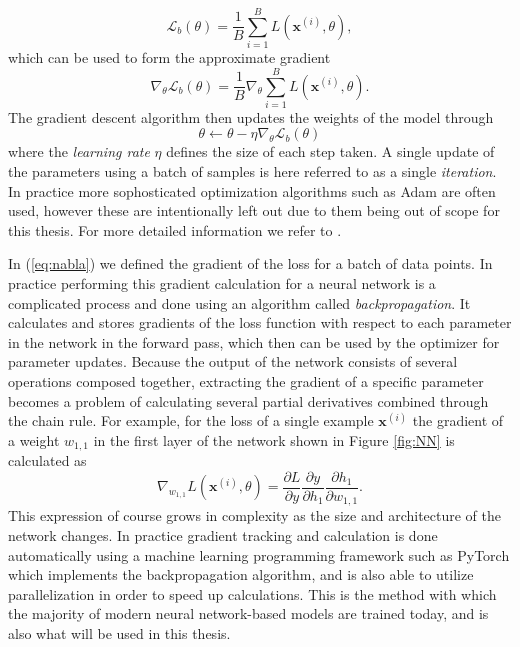 \documentclass{report}
\begin{document}
\begin{equation}
    \mathcal{L}_{b}(\theta) = \frac{1}{B}\sum_{i=1}^B L(\bm{x}^{(i)}, \theta),
\end{equation}
which can be used to form the approximate gradient
\begin{equation} \label{eq:nabla}
    \nabla_{\theta} \mathcal{L}_b(\theta) = \frac{1}{B} \nabla_{\theta} \sum_{i=1}^B L(\bm{x}^{(i)}, \theta).
\end{equation}
The gradient descent algorithm then updates the weights of the model through
\begin{equation}
    \theta \leftarrow \theta - \eta \nabla_{\theta} \mathcal{L}_b(\theta)
\end{equation}
where the \textit{learning rate} $\eta$ defines the size of each step taken. A single update of the parameters using a batch of samples is here referred to as a single \textit{iteration}. In practice more sophosticated optimization algorithms such as Adam are often used, however these are intentionally left out due to them being out of scope for this thesis. For more detailed information we refer to \cite{kingma2014adam, ruder2016overview}.

In (\ref{eq:nabla}) we defined the gradient of the loss for a batch of data points. In practice performing this gradient calculation for a neural network is a complicated process and done using an algorithm called \textit{backpropagation}. It calculates and stores gradients of the loss function with respect to each parameter in the network in the forward pass, which then can be used by the optimizer for parameter updates. Because the output of the network consists of several operations composed together, extracting the gradient of a specific parameter becomes a problem of calculating several partial derivatives combined through the chain rule. For example, for the loss of a single example $\bm{x}^{(i)}$ the gradient of a weight $w_{1,1}$ in the first layer of the network shown in Figure \ref{fig:NN} is calculated as
\begin{equation}
    \nabla_{w_{1,1}} L(\bm{x}^{(i)}, \theta) = \frac{\partial L}{\partial y} \frac{\partial y}{\partial h_1} \frac{\partial h_1}{\partial w_{1,1}}.
\end{equation}
This expression of course grows in complexity as the size and architecture of the network changes. In practice gradient tracking and calculation is done automatically using a machine learning programming framework such as PyTorch \cite{paszke2019pytorch} which implements the backpropagation algorithm, and is also able to utilize parallelization in order to speed up calculations. This is the method with which the majority of modern neural network-based models are trained today, and is also what will be used in this thesis.
\end{document}

